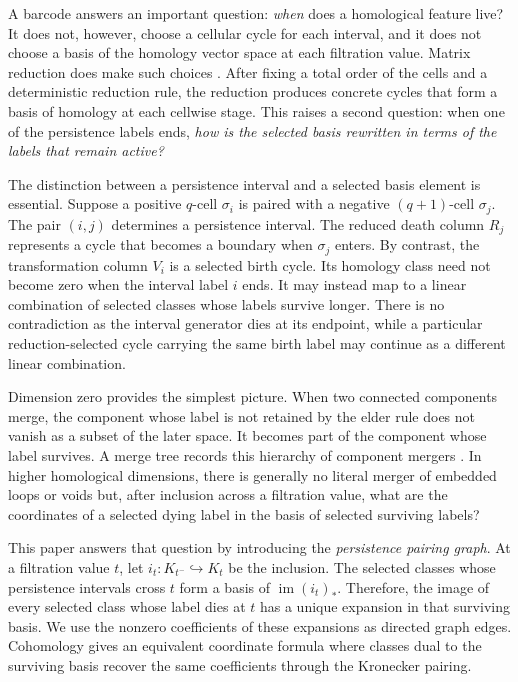 \documentclass[11pt]{article}
\theoremstyle{paperdefinition}
\theoremstyle{paperplain}
\theoremstyle{paperremark}
\begin{document}
A barcode answers an important question: \emph{when} does a homological feature live? It does not, however, choose a cellular cycle for each interval, and it does not choose a basis of the homology vector space at each filtration value. Matrix reduction does make such choices \cite{edelsbrunner2002topological, zomorodian2005computing, hang2021umatch}. After fixing a total order of the cells and a deterministic reduction rule, the reduction produces concrete cycles that form a basis of homology at each cellwise stage. This raises a second question: when one of the persistence labels ends, \emph{how is the selected basis rewritten in terms of the labels that remain active?}

The distinction between a persistence interval and a selected basis element is essential. Suppose a positive $q$-cell $\sigma_i$ is paired with a negative $(q+1)$-cell $\sigma_j$. The pair $(i,j)$ determines a persistence interval. The reduced death column $R_j$ represents a cycle that becomes a boundary when $\sigma_j$ enters. By contrast, the transformation column $V_i$ is a selected birth cycle. Its homology class need not become zero when the interval label $i$ ends. It may instead map to a linear combination of selected classes whose labels survive longer. There is no contradiction as the interval generator dies at its endpoint, while a particular reduction-selected cycle carrying the same birth label may continue as a different linear combination.

Dimension zero provides the simplest picture. When two connected components merge, the component whose label is not retained by the elder rule does not vanish as a subset of the later space. It becomes part of the component whose label survives. A merge tree records this hierarchy of component mergers \cite{carr2003computing,morozov2013interleaving, edelsbrunnerharer2010computational}. In higher homological dimensions, there is generally no literal merger of embedded loops or voids but, after inclusion across a filtration value, what are the coordinates of a selected dying label in the basis of selected surviving labels?

This paper answers that question by introducing the \emph{persistence pairing graph}. At a filtration value $t$, let $i_t:K_{t^-}\hookrightarrow K_t$ be the inclusion. The selected classes whose persistence intervals cross $t$ form a basis of $\operatorname{im}(i_t)_*$. Therefore, the image of every selected class whose label dies at $t$ has a unique expansion in that surviving basis. We use the nonzero coefficients of these expansions as directed graph edges. Cohomology gives an equivalent coordinate formula where classes dual to the surviving basis recover the same coefficients through the Kronecker pairing.
\end{document}
